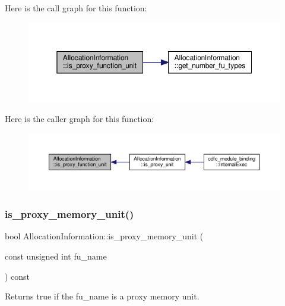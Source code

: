 Here is the call graph for this function\+:
\nopagebreak
\begin{figure}[H]
\begin{center}
\leavevmode
\includegraphics[width=350pt]{d7/d79/classAllocationInformation_ae1bd5d0f2008ba69461691144bbdc07f_cgraph}
\end{center}
\end{figure}
Here is the caller graph for this function\+:
\nopagebreak
\begin{figure}[H]
\begin{center}
\leavevmode
\includegraphics[width=350pt]{d7/d79/classAllocationInformation_ae1bd5d0f2008ba69461691144bbdc07f_icgraph}
\end{center}
\end{figure}
\mbox{\label{classAllocationInformation_aaf17678cabfddb5eb558d025060a68f5}} 
\subsubsection{\texorpdfstring{is\+\_\+proxy\+\_\+memory\+\_\+unit()}{is\_proxy\_memory\_unit()}}
{\footnotesize\ttfamily bool Allocation\+Information\+::is\+\_\+proxy\+\_\+memory\+\_\+unit (\begin{DoxyParamCaption}\item[{const unsigned int}]{fu\+\_\+name }\end{DoxyParamCaption}) const}



Returns true if the fu\+\_\+name is a proxy memory unit. 


